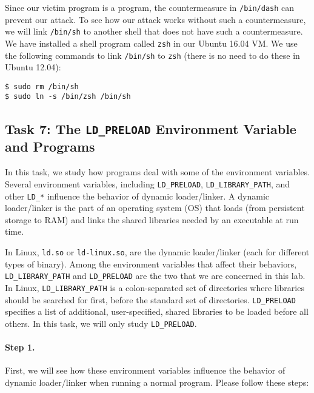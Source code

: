 Since our victim program is a \setuid program, 
the countermeasure in \texttt{/bin/dash} can prevent our attack. 
To see how our attack works without such a countermeasure, 
we will link \texttt{/bin/sh} to another shell that does not
have such a countermeasure.  We have installed a shell program
called \texttt{zsh} in our Ubuntu 16.04 VM. We use the following
commands to link \texttt{/bin/sh} to \texttt{zsh} (there is no need to do these in Ubuntu
12.04):

\begin{lstlisting}
$ sudo rm /bin/sh
$ sudo ln -s /bin/zsh /bin/sh
\end{lstlisting}




\subsection{Task 7: The {\tt LD\_PRELOAD} Environment 
Variable and \setuid Programs}


In this task, we study how \setuid programs deal
with some of the environment variables.
Several environment variables, including {\tt LD\_PRELOAD}, 
{\tt LD\_LIBRARY\_PATH}, and other {\tt LD\_*} influence the 
behavior of dynamic loader/linker.
A dynamic loader/linker is the part of an operating system (OS) that 
loads (from persistent storage to RAM) and links the shared libraries 
needed by an executable at run time. 

In Linux, {\tt ld.so} or {\tt ld-linux.so}, are the dynamic 
loader/linker (each for different types of binary).
Among the environment variables that affect their behaviors,
{\tt LD\_LIBRARY\_PATH} and {\tt LD\_PRELOAD} are the two
that we are concerned in this lab. 
In Linux, {\tt LD\_LIBRARY\_PATH} is a colon-separated set
of directories where libraries should be searched for first, before the
standard set of directories. 
{\tt LD\_PRELOAD} specifies a list of additional, user-specified, shared libraries to
be loaded before all others. In this task, we will only 
study {\tt LD\_PRELOAD}.


\paragraph{Step 1.} 
First, we will see how these environment variables influence the 
behavior of dynamic loader/linker when running a normal program. 
Please follow these steps:


